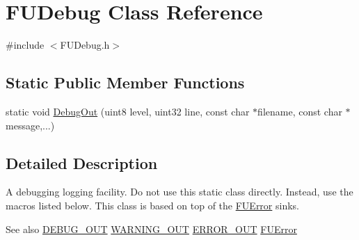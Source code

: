 \hypertarget{classFUDebug}{
\section{FUDebug Class Reference}
\label{classFUDebug}
}


{\ttfamily \#include $<$FUDebug.h$>$}

\subsection*{Static Public Member Functions}
\begin{DoxyCompactItemize}
\item 
static void \hyperlink{classFUDebug_a8497ac8f011328a86b4aedbaf85504dc}{DebugOut} (uint8 level, uint32 line, const char $\ast$filename, const char $\ast$message,...)
\end{DoxyCompactItemize}


\subsection{Detailed Description}
A debugging logging facility. Do not use this static class directly. Instead, use the macros listed below. This class is based on top of the \hyperlink{classFUError}{FUError} sinks.

\begin{DoxySeeAlso}{See also}
\hyperlink{FUDebug_8h_a20c2b8fc53eb5fc7c525a1a8b201e6f3}{DEBUG\_\-OUT} \hyperlink{FUDebug_8h_aad84ea318f0287c9b741da8ac0f0ed56}{WARNING\_\-OUT} \hyperlink{FUDebug_8h_a48e135959518fe8f1103622a977bd400}{ERROR\_\-OUT} \hyperlink{classFUError}{FUError} 
\end{DoxySeeAlso}


